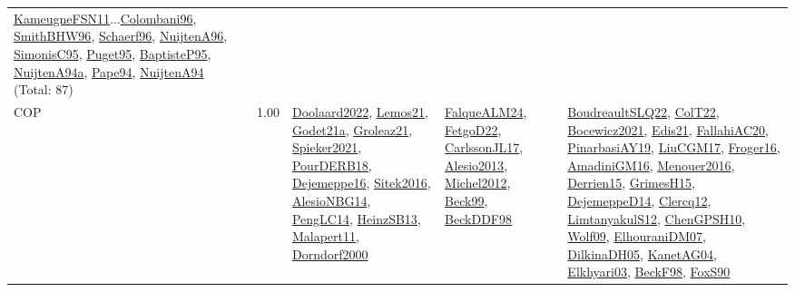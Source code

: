 {\begin{longtable}{p{3cm}r>{\raggedright\arraybackslash}p{6cm}>{\raggedright\arraybackslash}p{6cm}>{\raggedright\arraybackslash}p{8cm}}
\hyperref[detail:KameugneFSN11]{KameugneFSN11}...\hyperref[detail:Colombani96]{Colombani96}, \hyperref[detail:SmithBHW96]{SmithBHW96}, \hyperref[detail:Schaerf96]{Schaerf96}, \hyperref[detail:NuijtenA96]{NuijtenA96}, \hyperref[detail:SimonisC95]{SimonisC95}, \hyperref[detail:Puget95]{Puget95}, \hyperref[detail:BaptisteP95]{BaptisteP95}, \hyperref[detail:NuijtenA94a]{NuijtenA94a}, \hyperref[detail:Pape94]{Pape94}, \hyperref[detail:NuijtenA94]{NuijtenA94} (Total: 87)\\
\index{COP}\index{CP!COP}COP &  1.00 & \hyperref[detail:Doolaard2022]{Doolaard2022}, \hyperref[detail:Lemos21]{Lemos21}, \hyperref[detail:Godet21a]{Godet21a}, \hyperref[detail:Groleaz21]{Groleaz21}, \hyperref[detail:Spieker2021]{Spieker2021}, \hyperref[detail:PourDERB18]{PourDERB18}, \hyperref[detail:Dejemeppe16]{Dejemeppe16}, \hyperref[detail:Sitek2016]{Sitek2016}, \hyperref[detail:AlesioNBG14]{AlesioNBG14}, \hyperref[detail:PengLC14]{PengLC14}, \hyperref[detail:HeinzSB13]{HeinzSB13}, \hyperref[detail:Malapert11]{Malapert11}, \hyperref[detail:Dorndorf2000]{Dorndorf2000} & \hyperref[detail:FalqueALM24]{FalqueALM24}, \hyperref[detail:FetgoD22]{FetgoD22}, \hyperref[detail:CarlssonJL17]{CarlssonJL17}, \hyperref[detail:Alesio2013]{Alesio2013}, \hyperref[detail:Michel2012]{Michel2012}, \hyperref[detail:Beck99]{Beck99}, \hyperref[detail:BeckDDF98]{BeckDDF98} & \hyperref[detail:BoudreaultSLQ22]{BoudreaultSLQ22}, \hyperref[detail:ColT22]{ColT22}, \hyperref[detail:Bocewicz2021]{Bocewicz2021}, \hyperref[detail:Edis21]{Edis21}, \hyperref[detail:FallahiAC20]{FallahiAC20}, \hyperref[detail:PinarbasiAY19]{PinarbasiAY19}, \hyperref[detail:LiuCGM17]{LiuCGM17}, \hyperref[detail:Froger16]{Froger16}, \hyperref[detail:AmadiniGM16]{AmadiniGM16}, \hyperref[detail:Menouer2016]{Menouer2016}, \hyperref[detail:Derrien15]{Derrien15}, \hyperref[detail:GrimesH15]{GrimesH15}, \hyperref[detail:DejemeppeD14]{DejemeppeD14}, \hyperref[detail:Clercq12]{Clercq12}, \hyperref[detail:LimtanyakulS12]{LimtanyakulS12}, \hyperref[detail:ChenGPSH10]{ChenGPSH10}, \hyperref[detail:Wolf09]{Wolf09}, \hyperref[detail:ElhouraniDM07]{ElhouraniDM07}, \hyperref[detail:DilkinaDH05]{DilkinaDH05}, \hyperref[detail:KanetAG04]{KanetAG04}, \hyperref[detail:Elkhyari03]{Elkhyari03}, \hyperref[detail:BeckF98]{BeckF98}, \hyperref[detail:FoxS90]{FoxS90}\\

\end{longtable}}
